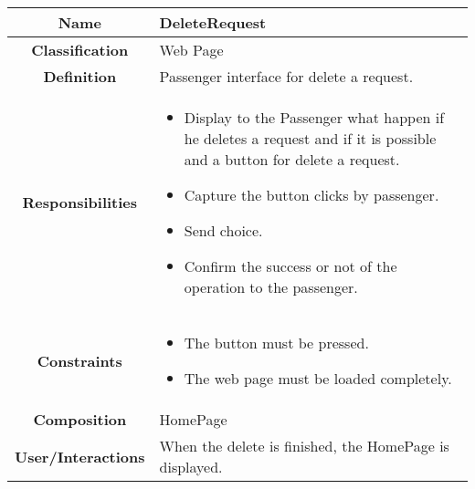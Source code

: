 \documentclass[11pt, a4paper,titlepage]{article}
\begin{document}
\begin{enumerate}
\begin{tabularx}{\textwidth}{| c | X |}
	\\
	\hline	
\end{tabularx}

\begin{tabularx}{\textwidth}{| c | X |}
	\hline
	\textbf{Name} & 
	DeleteRequest
	\\
	\hline
	\textbf{Classification} & 
	Web Page
	\\
	\hline
	\textbf{Definition} & 
     Passenger interface for delete a request.
	\\
	\hline
	\textbf{Responsibilities} &
	\begin{itemize}
		\item Display to the Passenger what happen if he deletes a request and if it is possible and a button for delete a request.
		\item Capture the button clicks by passenger.    
		\item Send choice.
		\item Confirm the success or not of the operation to the passenger.
	\end{itemize}
	\\
	\hline
	\textbf{Constraints} & 
		\begin{itemize}
		\item The button must be pressed.
		\item The web page must be loaded completely.
		\end{itemize}	
	\\
	\hline
	\textbf{Composition} &  HomePage
	\\
	\hline
	\textbf{User/Interactions} & 
	When the delete is finished, the HomePage is displayed.
	\\
	\hline	
\end{tabularx}


\end{enumerate}
\end{document}
